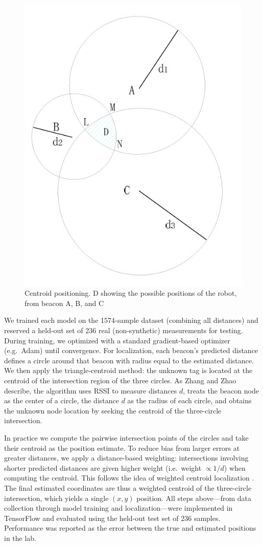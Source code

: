 \begin{figure}[!b]
  \centering
  \includegraphics[width=0.5\linewidth]{img/fig2.jpg}
  \caption{Centroid positioning. D showing the possible positions of the robot, from beacon A, B, and C \cite{WSNCentroid}}
  \label{fig:centroid}
\end{figure}

We trained each model on the 1574-sample dataset (combining all distances) and reserved a held-out set of 236 real (non-synthetic) measurements for testing. During training, we optimized with a standard gradient-based optimizer (e.g.\ Adam) until convergence. For localization, each beacon’s predicted distance defines a circle around that beacon with radius equal to the estimated distance. We then apply the triangle‐centroid method: the unknown tag is located at the centroid of the intersection region of the three circles. As Zhang and Zhao \cite{WSNCentroid} describe, the algorithm uses RSSI to measure distances $d$, treats the beacon node as the center of a circle, the distance $d$ as the radius of each circle, and obtains the unknown node location by seeking the centroid of the three-circle intersection. 

In practice we compute the pairwise intersection points of the circles and take their centroid as the position estimate. To reduce bias from larger errors at greater distances, we apply a distance-based weighting: intersections involving shorter predicted distances are given higher weight (i.e.\ weight $\propto 1/d$) when computing the centroid. This follows the idea of weighted centroid localization \cite{nagah2021enhanced}. The final estimated coordinates are thus a weighted centroid of the three-circle intersection, which yields a single $(x,y)$ position. All steps above—from data collection through model training and localization—were implemented in TensorFlow and evaluated using the held-out test set of 236 samples. Performance was reported as the error between the true and estimated positions in the lab.
